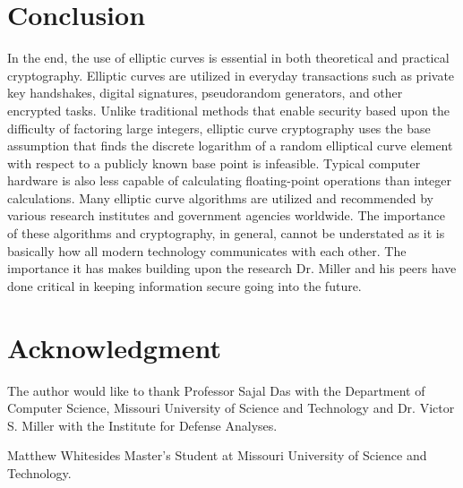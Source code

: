 \documentclass[journal,onecolumn]{IEEEtran}
\begin{document}
\section{Conclusion}
In the end, the use of elliptic curves is essential in both theoretical and practical cryptography. Elliptic curves are utilized in everyday transactions such as private key handshakes, digital signatures, pseudorandom generators, and other encrypted tasks. Unlike traditional methods that enable security based upon the difficulty of factoring large integers, elliptic curve cryptography uses the base assumption that finds the discrete logarithm of a random elliptical curve element with respect to a publicly known base point is infeasible. Typical computer hardware is also less capable of calculating floating-point operations than integer calculations. Many elliptic curve algorithms are utilized and recommended by various research institutes and government agencies worldwide. The importance of these algorithms and cryptography, in general, cannot be understated as it is basically how all modern technology communicates with each other. The importance it has makes building upon the research Dr. Miller and his peers have done critical in keeping information secure going into the future. 




\section*{Acknowledgment}
The author would like to thank Professor Sajal Das with the Department of Computer Science, Missouri University of Science and Technology and Dr. Victor S. Miller with the Institute for Defense Analyses.

\ifCLASSOPTIONcaptionsoff
  \newpage
\fi




\begin{IEEEbiographynophoto}{Matthew Whitesides}
  Master's Student at Missouri University of Science and Technology.
\end{IEEEbiographynophoto}

\end{document}

